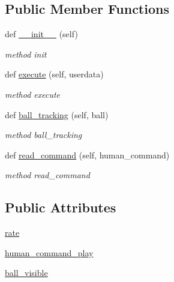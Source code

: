 \subsection*{Public Member Functions}
\begin{DoxyCompactItemize}
\item 
def \hyperlink{classbehavior__manager_1_1Normal__behavior_a7ab22900e936fc3921a269389b51e6ab}{\+\_\+\+\_\+init\+\_\+\+\_\+} (self)
\begin{DoxyCompactList}\small\item\em method init \end{DoxyCompactList}\item 
def \hyperlink{classbehavior__manager_1_1Normal__behavior_a15faab6a43a39510355baad4faaa808a}{execute} (self, userdata)
\begin{DoxyCompactList}\small\item\em method execute \end{DoxyCompactList}\item 
def \hyperlink{classbehavior__manager_1_1Normal__behavior_a19d07d077327e725321bc7d13aa3726e}{ball\+\_\+tracking} (self, ball)
\begin{DoxyCompactList}\small\item\em method ball\+\_\+tracking \end{DoxyCompactList}\item 
def \hyperlink{classbehavior__manager_1_1Normal__behavior_a5a152cc5837f1573c5101f18e86d7070}{read\+\_\+command} (self, human\+\_\+command)
\begin{DoxyCompactList}\small\item\em method read\+\_\+command \end{DoxyCompactList}\end{DoxyCompactItemize}
\subsection*{Public Attributes}
\begin{DoxyCompactItemize}
\item 
\hyperlink{classbehavior__manager_1_1Normal__behavior_a8c0881c34370caec4f5298f0ebe35489}{rate}
\item 
\hyperlink{classbehavior__manager_1_1Normal__behavior_ad3ddfca519e8fa6513d6356aa0fa2962}{human\+\_\+command\+\_\+play}
\item 
\hyperlink{classbehavior__manager_1_1Normal__behavior_a9231755f61898994c43ae8e5652ef1c9}{ball\+\_\+visible}
\end{DoxyCompactItemize}


